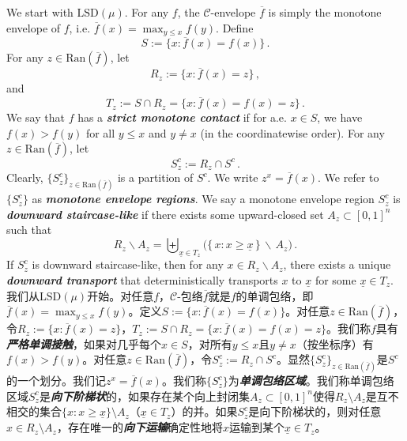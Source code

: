\documentclass[12pt,letterpaper]{article}
\newenvironment{original}{\color{black}}{}
\newenvironment{translation}{\color{blue}}{}
\theoremstyle{plain}
\theoremstyle{definition}
\theoremstyle{remark}
\newcommand{\C}{\mathcal{C}}
\theoremstyle{definition}
\begin{document}
\begin{original}
We start with $\text{LSD}(\mu)$. For any $f$, the $\C$-envelope $\overline{f}$ is simply the monotone envelope of $f$, i.e. $\overline{f}(x) = \max_{y \leq x} f(y)$. Define
\[S := \Big\{x: \overline{f}(x) = f(x)\Big\}\,.\]
For any $z \in \text{Ran}(\overline{f})$, let
\[R_z := \Big\{x: \overline{f}(x) = z\Big\}\,, \]
and
\[T_z := S \cap R_z = \Big\{x: \overline{f}(x) = f(x) = z\Big\}\,.\]
We say that $f$ has a \textit{\textbf{strict monotone contact}} if for a.e. $x \in S$, we have $f(x) > f(y)$ for all $y \leq x$ and $y \neq x$ (in the coordinatewise order). For any $z \in \text{Ran}(\overline{f})$, let
\[S^c_z:= R_z \cap S^c\,.\]
Clearly, $\{S^c_z\}_{z \in \text{Ran}(\overline{f})}$ is a partition of $S^c$. We write $z^x = \overline{f}(x)$. We refer to $\{S^c_z\}$ as \textit{\textbf{monotone envelope regions}}. We say a monotone envelope region $S^c_z$ is \textit{\textbf{downward staircase-like}} if there exists some upward-closed set $A_z \subset [0, 1]^n$ such that
\[R_z \backslash A_z = \biguplus_{\underline{x} \in T_z}\Big(\big\{\,x: x \geq \underline{x} \,\big\}\, \backslash \,A_z\Big) \,.\]
If $S^c_z$ is downward staircase-like, then for any $x \in R_z \backslash A_z$, there exists a unique \textit{\textbf{downward transport}} that deterministically transports $x$ to $\underline{x}$ for some $\underline{x} \in T_z$.
\end{original}
\begin{translation}
我们从$\text{LSD}(\mu)$开始。对任意$f$，$\C$-包络$\overline{f}$就是$f$的单调包络，即$\overline{f}(x) = \max_{y \leq x} f(y)$。定义$S := \{x: \overline{f}(x) = f(x)\}$。对任意$z \in \text{Ran}(\overline{f})$，令$R_z := \{x: \overline{f}(x) = z\}$，$T_z := S \cap R_z = \{x: \overline{f}(x) = f(x) = z\}$。我们称$f$具有\textit{\textbf{严格单调接触}}，如果对几乎每个$x \in S$，对所有$y \leq x$且$y \neq x$（按坐标序）有$f(x) > f(y)$。对任意$z \in \text{Ran}(\overline{f})$，令$S^c_z:= R_z \cap S^c$。显然$\{S^c_z\}_{z \in \text{Ran}(\overline{f})}$是$S^c$的一个划分。我们记$z^x = \overline{f}(x)$。我们称$\{S^c_z\}$为\textit{\textbf{单调包络区域}}。我们称单调包络区域$S^c_z$是\textit{\textbf{向下阶梯状}}的，如果存在某个向上封闭集$A_z \subset [0, 1]^n$使得$R_z \setminus A_z$是互不相交的集合$\{x: x \geq \underline{x}\} \setminus A_z$（$\underline{x} \in T_z$）的并。如果$S^c_z$是向下阶梯状的，则对任意$x \in R_z \setminus A_z$，存在唯一的\textit{\textbf{向下运输}}确定性地将$x$运输到某个$\underline{x} \in T_z$。
\end{translation}
\end{document}
